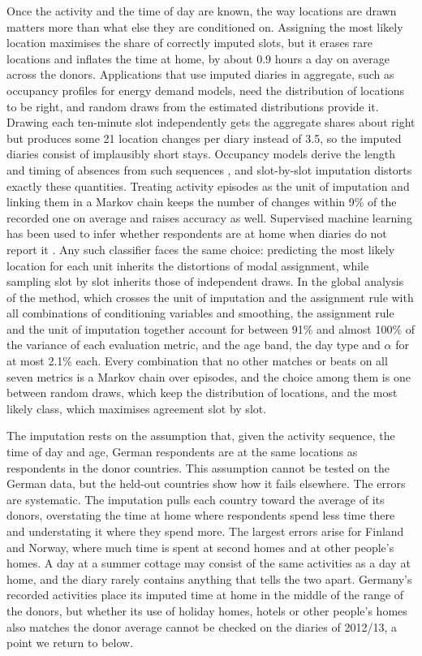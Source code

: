 \documentclass[a4paper]{article}
\begin{document}
Once the activity and the time of day are known, the way locations are drawn matters more than what else they are conditioned on. Assigning the most likely location maximises the share of correctly imputed slots, but it erases rare locations and inflates the time at home, by about 0.9 hours a day on average across the donors. Applications that use imputed diaries in aggregate, such as occupancy profiles for energy demand models, need the distribution of locations to be right, and random draws from the estimated distributions provide it. Drawing each ten-minute slot independently gets the aggregate shares about right but produces some 21 location changes per diary instead of 3.5, so the imputed diaries consist of implausibly short stays. Occupancy models derive the length and timing of absences from such sequences \parencite{richardsonHighresolutionDomesticBuilding2008,widenCombinedMarkovchainBottomup2009,aertsMethodIdentificationModelling2014,kleinebrahmUsingNeuralNetworks2021}, and slot-by-slot imputation distorts exactly these quantities. Treating activity episodes as the unit of imputation and linking them in a Markov chain keeps the number of changes within 9\% of the recorded one on average and raises accuracy as well. Supervised machine learning has been used to infer whether respondents are at home when diaries do not report it \parencite{araoInferringHomeOutofhome2025}. Any such classifier faces the same choice: predicting the most likely location for each unit inherits the distortions of modal assignment, while sampling slot by slot inherits those of independent draws. In the global analysis of the method, which crosses the unit of imputation and the assignment rule with all combinations of conditioning variables and smoothing, the assignment rule and the unit of imputation together account for between 91\% and almost 100\% of the variance of each evaluation metric, and the age band, the day type and $\alpha$ for at most 2.1\% each. Every combination that no other matches or beats on all seven metrics is a Markov chain over episodes, and the choice among them is one between random draws, which keep the distribution of locations, and the most likely class, which maximises agreement slot by slot.

The imputation rests on the assumption that, given the activity sequence, the time of day and age, German respondents are at the same locations as respondents in the donor countries. This assumption cannot be tested on the German data, but the held-out countries show how it fails elsewhere. The errors are systematic. The imputation pulls each country toward the average of its donors, overstating the time at home where respondents spend less time there and understating it where they spend more. The largest errors arise for Finland and Norway, where much time is spent at second homes and at other people's homes. A day at a summer cottage may consist of the same activities as a day at home, and the diary rarely contains anything that tells the two apart. Germany's recorded activities place its imputed time at home in the middle of the range of the donors, but whether its use of holiday homes, hotels or other people's homes also matches the donor average cannot be checked on the diaries of 2012/13, a point we return to below.
\end{document}
